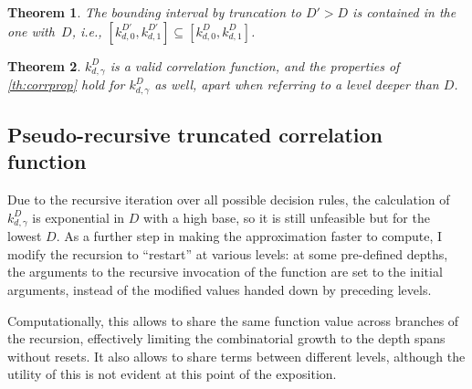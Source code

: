 \documentclass[a4paper]{article}
\newtheorem{theorem}{Theorem}
\theoremstyle{definition}
\begin{document}
    \begin{theorem}
        The bounding interval by truncation to $D' > D$ is contained in the one with~$D$, i.e., $[k^{D'}_{d,0}, k^{D'}_{d,1}] \subseteq [k^D_{d,0}, k^D_{d,1}]$. \label{th:filter}
    \end{theorem}

    \begin{theorem}
        $k^D_{d,\gamma}$ is a valid correlation function, and the properties of \autoref{th:corrprop} hold for $k^D_{d,\gamma}$ as well, apart when referring to a level deeper than $D$. \label{th:truncprop}
    \end{theorem}

    \subsection{Pseudo-recursive truncated correlation function}
    \label{sec:ptruncorr}

    Due to the recursive iteration over all possible decision rules, the calculation of $k^D_{d,\gamma}$ is exponential in $D$ with a high base, so it is still unfeasible but for the lowest $D$. As a further step in making the approximation faster to compute, I modify the recursion to ``restart'' at various levels: at some pre-defined depths, the arguments to the recursive invocation of the function are set to the initial arguments, instead of the modified values handed down by preceding levels.

    Computationally, this allows to share the same function value across branches of the recursion, effectively limiting the combinatorial growth to the depth spans without resets. It also allows to share terms between different levels, although the utility of this is not evident at this point of the exposition.
\end{document}
